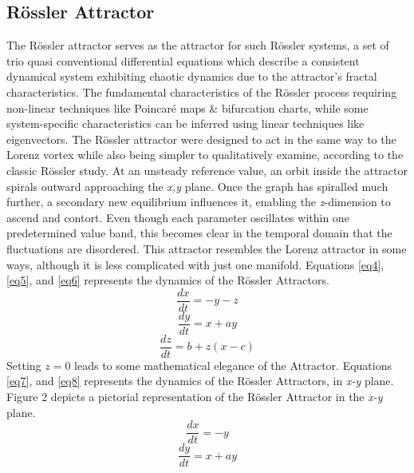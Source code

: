 \documentclass[conference]{IEEEtran}
\begin{document}
\subsection{Rössler Attractor}\label{sec2a}
The Rössler attractor serves as the attractor for such Rössler systems, a set of trio quasi conventional differential equations which describe a consistent dynamical system exhibiting chaotic dynamics due to the attractor's fractal characteristics. The fundamental characteristics of the Rössler process requiring non-linear techniques like Poincaré maps \& bifurcation charts, while some system-specific characteristics can be inferred using linear techniques like eigenvectors. The Rössler attractor were designed to act in the same way to the Lorenz vortex while also being simpler to qualitatively examine, according to the classic Rössler study. At an unsteady reference value, an orbit inside the attractor spirals outward approaching the \textit{x,y} plane. Once the graph has spiralled much further, a secondary new equilibrium influences it, enabling the \textit{z}-dimension to ascend and contort. Even though each parameter oscillates within one predetermined value band, this becomes clear in the temporal domain that the fluctuations are disordered. This attractor resembles the Lorenz attractor in some ways, although it is less complicated with just one manifold. Equations \ref{eq4}, \ref{eq5}, and \ref{eq6} represents the dynamics of the Rössler Attractors. 
\begin{equation}\label{eq4}
\frac{dx}{dt}=-y-z
\end{equation}
\begin{equation}\label{eq5}
\frac{dy}{dt}=x+ay
\end{equation}
\begin{equation}\label{eq6}
\frac{dz}{dt}=b+z(x-c)
\end{equation}
Setting $z=0$ leads to some mathematical elegance of the Attractor. Equations \ref{eq7}, and \ref{eq8} represents the dynamics of the Rössler Attractors, in \textit{x-y} plane. Figure 2 depicts a pictorial representation of the Rössler Attractor in the \textit{x-y} plane.
\begin{equation}\label{eq7}
\frac{dx}{dt}=-y
\end{equation}
\begin{equation}\label{eq8}
\frac{dy}{dt}=x+ay
\end{equation}
\end{document}
